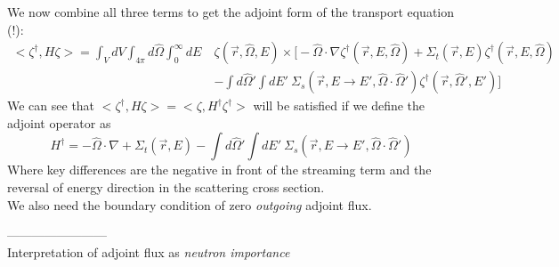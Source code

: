 \documentclass[12pt]{article}
\newcommand{\rvec}{\ensuremath{\vec{r}}}
\newcommand{\vOmega}{\ensuremath{\hat{\Omega}}}
\begin{document}
%
We now combine all three terms to get the adjoint form of the transport equation (!):
\begin{align*}
<\zeta^{\dagger}, H \zeta> = \int_{V} dV \int_{4\pi} d\vOmega \int_0^{\infty} dE \: &\zeta (\rvec, \vOmega, E) \times \biggl[-\vOmega \cdot \nabla \zeta^{\dagger}(\vec{r}, E, \vOmega)  + \Sigma_t(\rvec,E) \zeta^{\dagger}(\vec{r}, E, \vOmega) \\&- \int d\vOmega' \int dE'\: \Sigma_s(\rvec, E \rightarrow E', \vOmega \cdot \vOmega') \zeta^{\dagger}(\rvec, \vOmega', E') \biggr]
\end{align*}
%
We can see that $<\zeta^{\dagger}, H \zeta> = <\zeta, H^{\dagger} \zeta^{\dagger}>$ will be satisfied if we define the adjoint operator as
\[
H^{\dagger} = -\vOmega \cdot \nabla  + \Sigma_t(\rvec,E) - \int d\vOmega' \int dE'\: \Sigma_s(\rvec, E \rightarrow E', \vOmega \cdot \vOmega')
\]
Where key differences are the negative in front of the streaming term and the reversal of energy direction in the scattering cross section.\\
We also need the boundary condition of zero \textit{outgoing} adjoint flux.

------------------------\\
Interpretation of adjoint flux as \textit{neutron importance}
\end{document}
